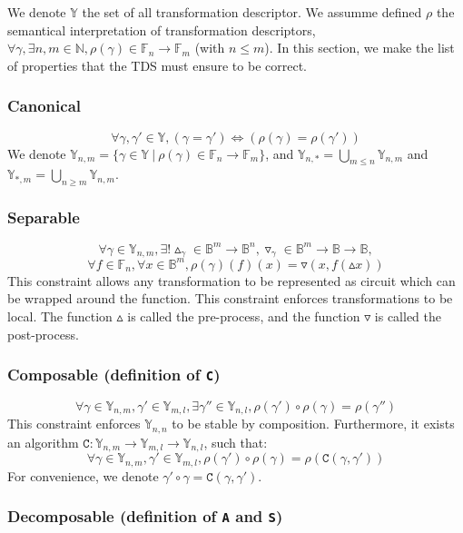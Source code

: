 \documentclass[a4paper,10pt]{article}
\newcommand{\N}{\mathbb{N}}%
\newcommand{\B}{\mathbb{B}}%
\newcommand{\F}{\mathbb{F}}%
\newcommand{\Y}{\mathbb{Y}}%
\begin{document}
We denote $\Y$ the set of all transformation descriptor.
We assumme defined $\rho$ the semantical interpretation of transformation descriptors, $\forall \gamma, \exists n, m \in\N, \rho(\gamma) \in \F_n \rightarrow \F_m$ (with $n\leq m$).
In this section, we make the list of properties that the TDS must ensure to be correct.

\subsubsection{Canonical}
\[\forall \gamma, \gamma' \in \Y, \left( \gamma = \gamma' \right) \Leftrightarrow \left( \rho(\gamma) = \rho(\gamma') \right) \]
We denote $\Y_{n, m} = \{ \gamma \in \Y ~|~ \rho(\gamma) \in \F_n \longrightarrow \F_m \}$, and $\Y_{n,*} = \bigcup_{m\leq n} \Y_{n, m}$ and $\Y_{*, m} = \bigcup_{n \geq m} \Y_{n, m}$.

\subsubsection{Separable}
\[\forall \gamma \in \Y_{n, m}, \exists! \vartriangle_\gamma \in \B^m \rightarrow \B^n, \triangledown_\gamma \in \B^m \rightarrow \B \rightarrow \B,\]
\[\forall f\in \F_n, \forall x \in \B^m, \rho(\gamma)(f)(x) = \triangledown(x, f(\vartriangle x))\]
This constraint allows any transformation to be represented as circuit which can be wrapped around the function.
This constraint enforces transformations to be local.
The function $\vartriangle$ is called the pre-process, and the function $\triangledown$ is called the post-process.

\subsubsection{Composable (definition of \texttt{C})}
\[\forall \gamma \in \Y_{n, m}, \gamma' \in \Y_{m, l}, \exists \gamma'' \in \Y_{n, l}, \rho(\gamma') \circ 
\rho(\gamma) = \rho(\gamma'')\]
This constraint enforces $\Y_{n, n}$ to be stable by composition.
Furthermore, it exists an algorithm $\mathtt{C} : \Y_{n, m} \rightarrow \Y_{m, l} \rightarrow \Y_{n, l}$, such that:
\[\forall \gamma \in \Y_{n, m}, \gamma' \in \Y_{m, l}, \rho(\gamma') \circ \rho(\gamma) = \rho(\mathtt{C}(\gamma, \gamma'))\]
For convenience, we denote $\gamma' \circ \gamma = \mathtt{C}(\gamma, \gamma')$.

\subsubsection{Decomposable (definition of \texttt{A} and \texttt{S})}
\end{document}
